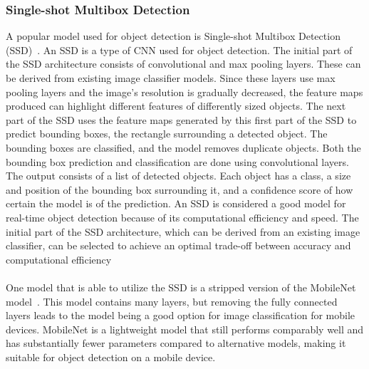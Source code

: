 
\subsubsection{Single-shot Multibox Detection}
\label{ssdbackground}
A popular model used for object detection is Single-shot Multibox Detection (SSD)~\cite{ssd}. An SSD is a type of CNN used for object detection. The initial part of the SSD architecture consists of convolutional and max pooling layers. These can be derived from existing image classifier models. Since these layers use max pooling layers and the image's resolution is gradually decreased, the feature maps produced can highlight different features of differently sized objects. The next part of the SSD uses the feature maps generated by this first part of the SSD to predict bounding boxes, the rectangle surrounding a detected object. The bounding boxes are classified, and the model removes duplicate objects. Both the bounding box prediction and classification are done using convolutional layers. The output consists of a list of detected objects. Each object has a class, a size and position of the bounding box surrounding it, and a confidence score of how certain the model is of the prediction. An SSD is considered a good model for real-time object detection because of its computational efficiency and speed. The initial part of the SSD architecture, which can be derived from an existing image classifier, can be selected to achieve an optimal trade-off between accuracy and computational efficiency~\cite{mobilenet}
\\ \\
One model that is able to utilize the SSD is a stripped version of the MobileNet model~\cite{mobilenet}. This model contains many layers, but removing the fully connected layers leads to the model being a good option for image classification for mobile devices. MobileNet is a lightweight model that still performs comparably well and has substantially fewer parameters compared to alternative models, making it suitable for object detection on a mobile device.


